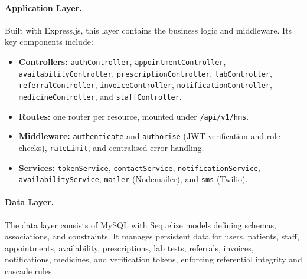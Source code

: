 \documentclass[12pt,a4paper]{report}
\begin{document}
\paragraph{Application Layer.} Built with Express.js, this layer contains the business
logic and middleware. Its key components include:
\begin{itemize}[leftmargin=1.4em, itemsep=1pt]
  \item \textbf{Controllers:} \texttt{authController}, \texttt{appointmentController},
        \texttt{availabilityController}, \texttt{prescriptionController},
        \texttt{labController}, \texttt{referralController}, \texttt{invoiceController},
        \texttt{notificationController}, \texttt{medicineController}, and
        \texttt{staffController}.
  \item \textbf{Routes:} one router per resource, mounted under \texttt{/api/v1/hms}.
  \item \textbf{Middleware:} \texttt{authenticate} and \texttt{authorise} (JWT
        verification and role checks), \texttt{rateLimit}, and centralised error
        handling.
  \item \textbf{Services:} \texttt{tokenService}, \texttt{contactService},
        \texttt{notificationService}, \texttt{availabilityService},
        \texttt{mailer} (Nodemailer), and \texttt{sms} (Twilio).
\end{itemize}

\paragraph{Data Layer.} The data layer consists of MySQL with Sequelize models defining
schemas, associations, and constraints. It manages persistent data for users, patients,
staff, appointments, availability, prescriptions, lab tests, referrals, invoices,
notifications, medicines, and verification tokens, enforcing referential integrity and
cascade rules.
\end{document}
